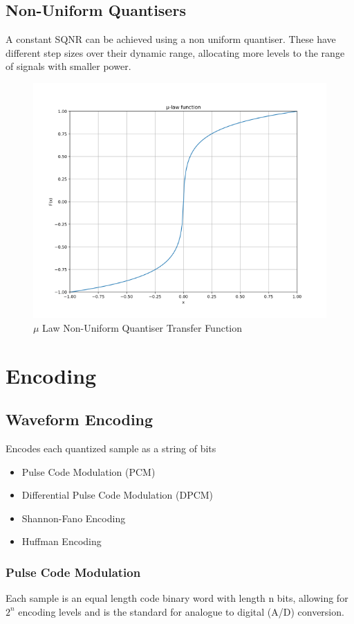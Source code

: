 \documentclass[oneside]{book}
\begin{document}
            \subsection{Non-Uniform Quantisers}
                A constant SQNR can be achieved using a non uniform quantiser. These have different step sizes over their dynamic range, allocating more levels
                to the range of signals with smaller power.
                \begin{figure}[H]
                    \centering
                    \includegraphics[width=0.4\linewidth]{figures/non_uniform_quantiser.png}
                    \caption{$\mu$ Law Non-Uniform Quantiser Transfer Function}
                \end{figure}
        \section{Encoding}
            \subsection{Waveform Encoding}
                Encodes each quantized sample as a string of bits
                \begin{itemize}
                    \item Pulse Code Modulation (PCM)
                    \item Differential Pulse Code Modulation (DPCM)
                    \item Shannon-Fano Encoding
                    \item Huffman Encoding
                \end{itemize}
                \subsubsection{Pulse Code Modulation}
                    Each sample is an equal length code binary word with length n bits, allowing for $2^n$ encoding levels and
                    is the standard for analogue to digital (A/D) conversion.
\end{document}
